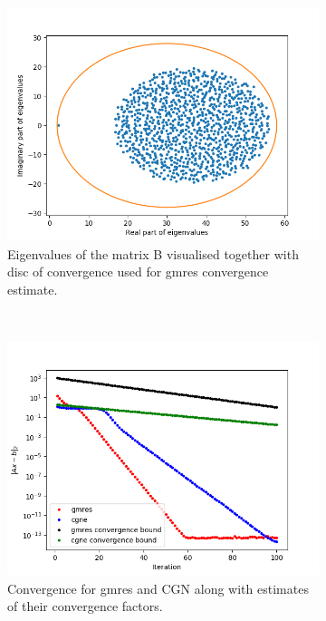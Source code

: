 \begin{figure}[h!]
	\centering
	\begin{subfigure}[t]{0.49\textwidth}
		\includegraphics[width=\textwidth]{Eigens.png}
		\caption{Eigenvalues of the matrix B visualised together with disc of convergence used for gmres convergence estimate.}
	\end{subfigure}~
	\begin{subfigure}[t]{0.49\textwidth}
		\includegraphics[width=\textwidth]{error_bound.png}	
		\caption{Convergence for gmres and CGN along with estimates of their convergence factors.}
	\end{subfigure}
	\caption{}
	\label{task6b}
\end{figure} 
